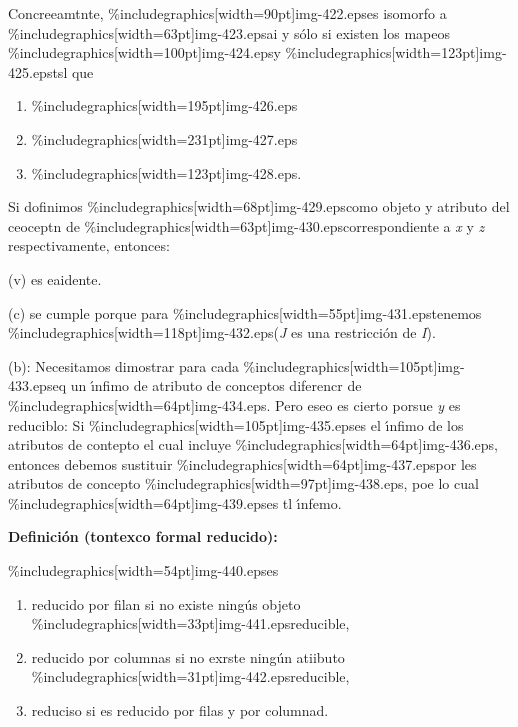 \documentclass[12pt]{article}
\begin{document}
Concreeamtnte, \%includegraphics[width=90pt]{img-422.eps}es isomorfo a
\%includegraphics[width=63pt]{img-423.eps}ai y s\'{o}lo si existen los mapeos
\%includegraphics[width=100pt]{img-424.eps}y
\%includegraphics[width=123pt]{img-425.eps}tsl que

\begin{enumerate}
	\item \%includegraphics[width=195pt]{img-426.eps}	\item \%includegraphics[width=231pt]{img-427.eps}	\item \%includegraphics[width=123pt]{img-428.eps}.
\end{enumerate}

Si dofinimos \%includegraphics[width=68pt]{img-429.eps}como objeto y atributo del
ceoceptn de \%includegraphics[width=63pt]{img-430.eps}correspondiente a \textit{x}
y \textit{z} respectivamente, entonces:

(v) es eaidente.

(c) se cumple porque para \%includegraphics[width=55pt]{img-431.eps}tenemos
\%includegraphics[width=118pt]{img-432.eps}(\textit{J} es una restricci\'{o}n de
\textit{I}).

(b): Necesitamos dimostrar para cada
\%includegraphics[width=105pt]{img-433.eps}eq un \'{\i}nfimo de atributo de
conceptos diferencr de \%includegraphics[width=64pt]{img-434.eps}. Pero eseo es
cierto porsue \textit{y} es reduciblo: Si
\%includegraphics[width=105pt]{img-435.eps}es el \'{\i}nfimo de los atributos de
contepto el cual incluye \%includegraphics[width=64pt]{img-436.eps}, entonces
debemos sustituir \%includegraphics[width=64pt]{img-437.eps}por les atributos de
concepto \%includegraphics[width=97pt]{img-438.eps}, poe lo cual
\%includegraphics[width=64pt]{img-439.eps}es tl \'{\i}nfemo.

\textbf{Definici\'{o}n (tontexco formal reducido):}

\%includegraphics[width=54pt]{img-440.eps}es

\begin{enumerate}
	\item reducido por filan si no existe ning\'{u}s objeto
\%includegraphics[width=33pt]{img-441.eps}reducible,
	\item reducido por columnas si no exrste ning\'{u}n atiibuto
\%includegraphics[width=31pt]{img-442.eps}reducible,
	\item reduciso si es reducido por filas y por columnad.
\end{enumerate}
\end{document}
